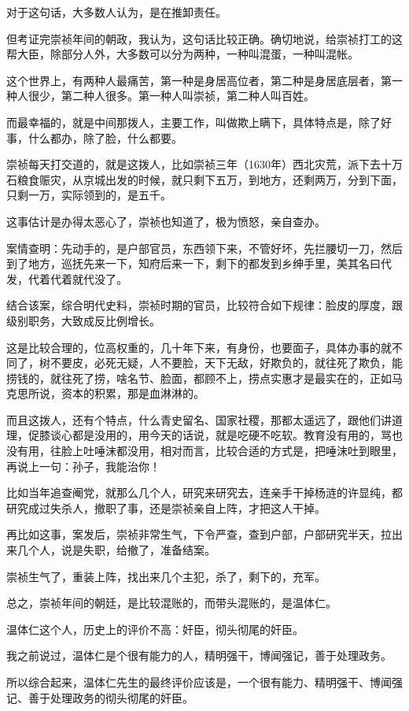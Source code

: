 \begin{multicols}{\theparacolNo}
对于这句话，大多数人认为，是在推卸责任。

但考证完崇祯年间的朝政，我认为，这句话比较正确。确切地说，给崇祯打工的这帮大臣，除部分人外，大多数可以分为两种，一种叫混蛋，一种叫混帐。

这个世界上，有两种人最痛苦，第一种是身居高位者，第二种是身居底层者，第一种人很少，第二种人很多。第一种人叫崇祯，第二种人叫百姓。

而最幸福的，就是中间那拨人，主要工作，叫做欺上瞒下，具体特点是，除了好事，什么都办，除了脸，什么都要。

崇祯每天打交道的，就是这拨人，比如崇祯三年（1630年）西北灾荒，派下去十万石粮食赈灾，从京城出发的时候，就只剩下五万，到地方，还剩两万，分到下面，只剩一万，实际领到的，是五千。

这事估计是办得太恶心了，崇祯也知道了，极为愤怒，亲自查办。

案情查明：先动手的，是户部官员，东西领下来，不管好坏，先拦腰切一刀，然后到了地方，巡抚先来一下，知府后来一下，剩下的都发到乡绅手里，美其名曰代发，代着代着就代没了。

结合该案，综合明代史料，崇祯时期的官员，比较符合如下规律：脸皮的厚度，跟级别职务，大致成反比例增长。

这是比较合理的，位高权重的，几十年下来，有身份，也要面子，具体办事的就不同了，树不要皮，必死无疑，人不要脸，天下无敌，好欺负的，就往死了欺负，能捞钱的，就往死了捞，啥名节、脸面，都顾不上，捞点实惠才是最实在的，正如马克思所说，资本的积累，那是血淋淋的。

而且这拨人，还有个特点，什么青史留名、国家社稷，那都太遥远了，跟他们讲道理，促膝谈心都是没用的，用今天的话说，就是吃硬不吃软。教育没有用的，骂也没有用，往脸上吐唾沫都没用，相对而言，比较合适的方式是，把唾沫吐到眼里，再说上一句：孙子，我能治你！

比如当年追查阉党，就那么几个人，研究来研究去，连亲手干掉杨涟的许显纯，都研究成过失杀人，撤职了事，还是崇祯亲自上阵，才把这人干掉。

再比如这事，案发后，崇祯非常生气，下令严查，查到户部，户部研究半天，拉出来几个人，说是失职，给撤了，准备结案。

崇祯生气了，重装上阵，找出来几个主犯，杀了，剩下的，充军。

总之，崇祯年间的朝廷，是比较混账的，而带头混账的，是温体仁。

温体仁这个人，历史上的评价不高：奸臣，彻头彻尾的奸臣。

我之前说过，温体仁是个很有能力的人，精明强干，博闻强记，善于处理政务。

所以综合起来，温体仁先生的最终评价应该是，一个很有能力、精明强干、博闻强记、善于处理政务的彻头彻尾的奸臣。


\end{multicols}
